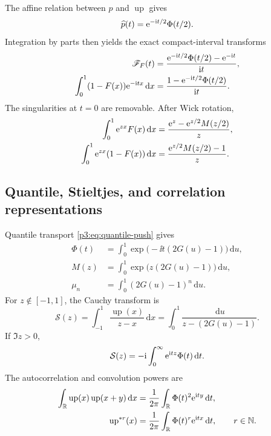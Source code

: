 \documentclass[11pt]{article}
\theoremstyle{definition}
\theoremstyle{remark}
\newcommand{\R}{\mathbb R}
\newcommand{\N}{\mathbb N}
\newcommand{\dd}{\,\mathrm d}
\newcommand{\Up}{\operatorname{up}}
\begin{document}
The affine relation between $p$ and $\Up$ gives
\begin{equation}\label{p3:eq:p-transform}
 \widehat p(t)=\mathrm e^{-\mathrm i t/2}\Phi(t/2).
\end{equation}
Integration by parts then yields the exact compact-interval transforms
\begin{align}
 \mathscr F_F(t)
 &=\frac{\e^{-\ii t/2}\Phi(t/2)-\e^{-\ii t}}{\ii t},
 \label{p3:eq:F-transform-product}\\
 \int_0^1(1-F(x))\e^{-\ii tx}\dd x
 &=\frac{1-\e^{-\ii t/2}\Phi(t/2)}{\ii t}.
 \label{p3:eq:survival-transform-product}
\end{align}
The singularities at $t=0$ are removable.  After Wick rotation,
\begin{align}
 \int_0^1\e^{zx}F(x)\dd x
 &=\frac{\e^z-\e^{z/2}M(z/2)}{z},\label{p3:eq:F-Laplace}\\
 \int_0^1\e^{zx}(1-F(x))\dd x
 &=\frac{\e^{z/2}M(z/2)-1}{z}.
 \label{p3:eq:survival-Laplace}
\end{align}

\subsection{Quantile, Stieltjes, and correlation representations}

Quantile transport \eqref{p3:eq:quantile-push} gives
\begin{align}
 \Phi(t)&=\int_0^1\exp\bigl(-\ii t(2G(u)-1)\bigr)\dd u,
 \label{p3:eq:Phi-quantile}\\
 M(z)&=\int_0^1\exp\bigl(z(2G(u)-1)\bigr)\dd u,
 \label{p3:eq:M-quantile}\\
 \mu_n&=\int_0^1(2G(u)-1)^n\dd u.\label{p3:eq:moments-quantile}
\end{align}
For $z\notin[-1,1]$, the Cauchy transform is
\begin{equation}\label{p3:eq:Cauchy-quantile}
 \mathcal S(z)=\int_{-1}^1\frac{\Up(x)}{z-x}\dd x
 =\int_0^1\frac{\dd u}{z-(2G(u)-1)}.
\end{equation}
If $\Im z>0$,
\begin{equation}\label{p3:eq:Cauchy-Fourier}
 \mathcal S(z)=-\ii\int_0^\infty\e^{\ii tz}\Phi(t)\dd t.
\end{equation}
The autocorrelation and convolution powers are
\begin{align}
 \int_\R\Up(x)\Up(x+y)\dd x
 &=\frac1{2\pi}\int_\R\Phi(t)^2\e^{\ii ty}\dd t,
 \label{p3:eq:autocorrelation}\\
 \Up^{*r}(x)&=\frac1{2\pi}\int_\R\Phi(t)^r\e^{\ii tx}\dd t,
 \qquad r\in\N.\label{p3:eq:convolution-powers}
\end{align}
\end{document}
